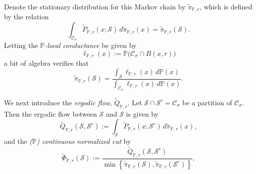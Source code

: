 \documentclass[11pt,twoside]{article}
\newcommand{\set}[1]{\left\{#1\right\}}
\newcommand{\1}{\mathbf{1}}
\newcommand{\Pbb}{\mathbb{P}}
\newcommand{\Sset}{\mathcal{S}}
\newcommand{\Cset}{\mathcal{C}}
\newcommand{\Csig}{\Cset_{\sigma}}
\newcommand{\piwt}{\widetilde{\pi}}
\begin{document}
Denote the stationary distribution for this Markov chain by $\piwt_{\Pbb,r}$, which is defined by the relation
\begin{equation*}
\int_{\Csig} \widetilde{P}_{\Pbb,r}(x; \Sset) \,d \piwt_{\Pbb,r}(x) = \piwt_{\Pbb,r}(\Sset).
\end{equation*}
Letting the \emph{$\Pbb$-local conductance} be given by
\begin{equation*}
\ell_{\Pbb,r}(x) := \Pbb\bigl(\Csig \cap B(x,r)\bigr)
\end{equation*}
a bit of algebra verifies that
\begin{equation*}
\piwt_{\Pbb,r}(\Sset) = \frac{\int_{\Sset} \ell_{\Pbb,r}(x) \,d \Pbb(x) }{\int_{\Csig} \ell_{\Pbb,r}(x) \,d \Pbb(x)}.
\end{equation*}

We next introduce the \emph{ergodic flow}, $\widetilde{Q}_{\Pbb,r}$. Let $\Sset \cap \Sset^c = \Csig$ be a partition of $\Csig$. Then the ergodic flow between $\Sset$ and $\Sset$ is given by 
\begin{equation*}
\widetilde{Q}_{\Pbb,r}(\Sset, \Sset^c) := \int_{\Sset} \widetilde{P}_{\Pbb,r}(x; \Sset^c) \,d\piwt_{\Pbb,r}(x), 
\end{equation*}
and the \emph{($\Pbb$) continuous normalized cut} by
\begin{equation*}
\widetilde{\Phi}_{\Pbb,r}(\Sset) := \frac{\widetilde{Q}_{\Pbb,r}(\Sset, \Sset^c)}{\min \set{\piwt_{\Pbb,r}(\Sset),\piwt_{\Pbb,r}(\Sset^c)}},
\end{equation*}
\end{document}
